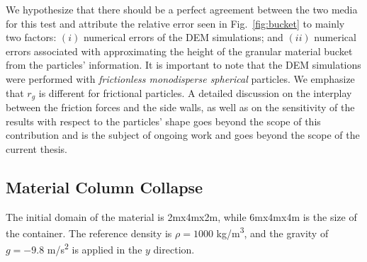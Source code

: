 We hypothesize that there should be a perfect agreement between the two media for this test and attribute the relative error seen in Fig.~\ref{fig:bucket} to mainly two factors: $(i)$ numerical errors of the DEM simulations; and $(ii)$ numerical errors associated with approximating the height of the granular material bucket from the particles' information. It is important to note that the DEM simulations were performed with \textit{frictionless monodisperse spherical} particles. We emphasize that $r_g$ is  different for frictional particles. A detailed discussion on the interplay between the friction forces and the side walls, as well as on the sensitivity of the results with respect to the particles' shape goes beyond the scope of this contribution and is the subject of ongoing work and goes beyond the scope of the current thesis.


\subsection{Material Column Collapse}
The initial domain of the material is 2\si{m}x4\si{m}x2\si{m}, while 6\si{m}x4\si{m}x4\si{m} is the size of the container. The reference density is $\rho=1000$ \si{kg/m^3}, and the gravity of $g=-9.8$ \si{m/s^2} is applied in the $y$ direction.

